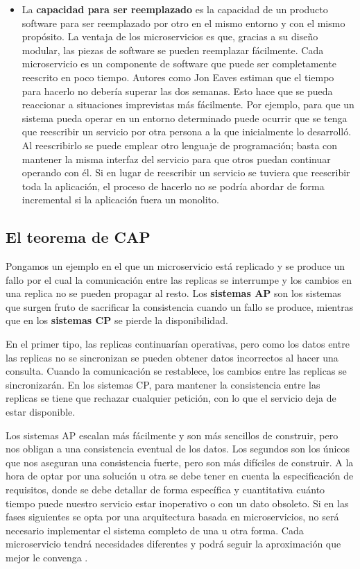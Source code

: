 \documentclass[11pt,spanish,listoffigures]{tfgetsinf}
\begin{document}
\begin{itemize}
\item La \textbf{capacidad para ser reemplazado} es la capacidad de un producto software para ser reemplazado por otro en el mismo entorno y con el mismo propósito. La ventaja de los microservicios es que, gracias a su diseño modular, las piezas de software se pueden reemplazar fácilmente. Cada microservicio es un componente de software que puede ser completamente reescrito en poco tiempo. Autores como Jon Eaves \cite{Eaves2014} estiman que el tiempo para hacerlo no debería superar las dos semanas. Esto hace que se pueda reaccionar a situaciones imprevistas más fácilmente. Por ejemplo, para que un sistema pueda operar en un entorno determinado puede ocurrir que se tenga que reescribir un servicio por otra persona a la que inicialmente lo desarrolló. Al reescribirlo se puede emplear otro lenguaje de programación; basta con mantener la misma interfaz del servicio para que otros puedan continuar operando con él. Si en lugar de reescribir un servicio se tuviera que reescribir toda la aplicación, el proceso de hacerlo no se podría abordar de forma incremental si la aplicación fuera un monolito.

\end{itemize}

\subsection{El teorema de CAP}

Pongamos un ejemplo en el que un microservicio está replicado y se produce un fallo por el cual la comunicación entre las replicas se interrumpe y los cambios en una replica no se pueden propagar al resto. Los \textbf{sistemas AP} son los sistemas que surgen fruto de sacrificar la consistencia cuando un fallo se produce, mientras que en los \textbf{sistemas CP} se pierde la disponibilidad. 

En el primer tipo, las replicas continuarían operativas, pero como los datos entre las replicas no se sincronizan se pueden obtener datos incorrectos al hacer una consulta. Cuando la comunicación se restablece, los cambios entre las replicas se sincronizarán. En los sistemas CP, para mantener la consistencia entre las replicas se tiene que rechazar cualquier petición, con lo que el servicio deja de estar disponible.

Los sistemas AP escalan más fácilmente y son más sencillos de construir, pero nos obligan a una consistencia eventual de los datos. Los segundos son los únicos que nos aseguran una consistencia fuerte, pero son más difíciles de construir. A la hora de optar por una solución u otra se debe tener en cuenta la especificación de requisitos, donde se debe detallar de forma específica y cuantitativa cuánto tiempo puede nuestro servicio estar inoperativo o con un dato obsoleto. Si en las fases siguientes se opta por una arquitectura basada en microservicios, no será necesario implementar el sistema completo de una u otra forma. Cada microservicio tendrá necesidades diferentes y podrá seguir la aproximación que mejor le convenga \cite{Newman2015a}.
\end{document}
